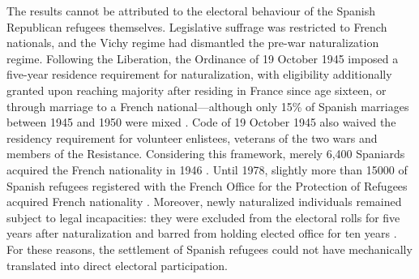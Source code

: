 The results cannot be attributed to the electoral behaviour of the Spanish Republican refugees themselves. Legislative suffrage was restricted to French nationals, and the Vichy regime had dismantled the pre-war naturalization regime. Following the Liberation, the Ordinance of 19 October 1945 imposed a five-year residence requirement for naturalization, with eligibility additionally granted upon reaching majority after residing in France since age sixteen, or through marriage to a French national—although only 15\% of Spanish marriages between 1945 and 1950 were mixed \citep{Angoustures1997}. Code of 19 October 1945 also waived the residency requirement for volunteer enlistees, veterans of the two wars and members of the Resistance. Considering this framework, merely 6,400 Spaniards acquired the French nationality in 1946 \citep{spire_thave_1999}. Until 1978, slightly more than 15000 of Spanish refugees registered with the French Office for the Protection of Refugees acquired French nationality \citep{siglo_inmigracion_2009}. Moreover, newly naturalized individuals remained subject to legal incapacities: they were excluded from the electoral rolls for five years after naturalization and barred from holding elected office for ten years \citep{code_nationalite_fr_1945}. For these reasons, the settlement of Spanish refugees could not have mechanically translated into direct electoral participation.